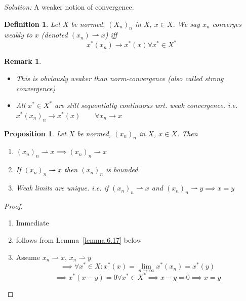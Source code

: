 \documentclass[a4paper]{article}
\newcounter{lecref}[section]
\numberwithin{lecref}{section}
\newtheorem{definition}[lecref]{Definition}
\newtheorem*{Remark}{Remark}
\newtheorem{proposition}[lecref]{Proposition}
\begin{document}
\emph{Solution:} A weaker notion of convergence.

\begin{definition}
	\label{definition:6.15}
	Let $X$ be normed, $(X_n)_n$ in $X$, $x \in X$.
	We say $x_n$ \emph{converges weakly} to $x$ (denoted $(x_n) \rightharpoonup x$) iff
	\[ x^*(x_n) \to x^*(x) \forall x^* \in X^* \]
\end{definition}

\begin{Remark}
	\begin{itemize}
		\item This is obviously weaker than norm-convergence (also called \emph{strong convergence})
		\item All $x^* \in X^*$ are still sequentially continuous wrt. weak convergence.
			i.e. $x^*(x_n)_n \to x^*(x) \qquad \forall x_n \to x$
	\end{itemize}
\end{Remark}

\begin{proposition}
	\label{proposition:6.16}
	Let $X$ be normed, $(x_n)_n$ in $X$, $x \in X$. Then
	\begin{enumerate}
		\item $(x_n)_n \rightharpoonup x \implies (x_n)_n \rightharpoonup x$
		\item If $(x_n)_n \rightharpoonup x$ then $(x_n)_n$ is bounded
		\item Weak limits are unique. i.e. if $(x_n)_n \rightharpoonup x$ and $(x_n)_n \rightharpoonup y \implies x = y$
	\end{enumerate}
\end{proposition}

\begin{proof}
	\begin{enumerate}
		\item Immediate
		\item follows from Lemma~\ref{lemma:6.17} below
		\item Assume $x_n \rightharpoonup x$, $x_n \rightharpoonup y$
			\[ \implies \forall x^* \in X: x^*(x) = \lim_{n \to \infty} x^*(x_n) = x^*(y) \]
			\[ \implies x^*(x - y) = 0 \forall x^* \in X^* \implies x - y = 0 \implies x = y \]
	\end{enumerate}
\end{proof}
\end{document}

